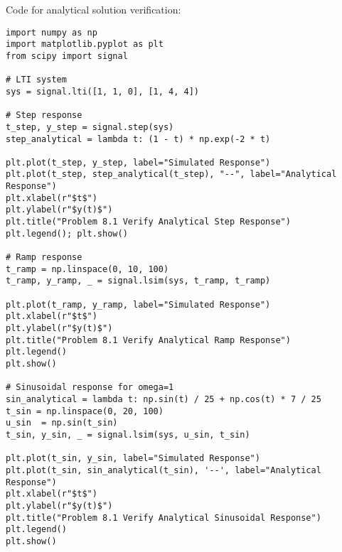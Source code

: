 Code for analytical solution verification:

\begin{verbatim}
import numpy as np
import matplotlib.pyplot as plt
from scipy import signal

# LTI system
sys = signal.lti([1, 1, 0], [1, 4, 4])

# Step response
t_step, y_step = signal.step(sys)
step_analytical = lambda t: (1 - t) * np.exp(-2 * t)

plt.plot(t_step, y_step, label="Simulated Response")
plt.plot(t_step, step_analytical(t_step), "--", label="Analytical Response")
plt.xlabel(r"$t$")
plt.ylabel(r"$y(t)$")
plt.title("Problem 8.1 Verify Analytical Step Response")
plt.legend(); plt.show()

# Ramp response
t_ramp = np.linspace(0, 10, 100)
t_ramp, y_ramp, _ = signal.lsim(sys, t_ramp, t_ramp)

plt.plot(t_ramp, y_ramp, label="Simulated Response")
plt.xlabel(r"$t$")
plt.ylabel(r"$y(t)$")
plt.title("Problem 8.1 Verify Analytical Ramp Response")
plt.legend()
plt.show()

# Sinusoidal response for omega=1
sin_analytical = lambda t: np.sin(t) / 25 + np.cos(t) * 7 / 25
t_sin = np.linspace(0, 20, 100)
u_sin  = np.sin(t_sin)
t_sin, y_sin, _ = signal.lsim(sys, u_sin, t_sin)

plt.plot(t_sin, y_sin, label="Simulated Response")
plt.plot(t_sin, sin_analytical(t_sin), '--', label="Analytical Response")
plt.xlabel(r"$t$")
plt.ylabel(r"$y(t)$")
plt.title("Problem 8.1 Verify Analytical Sinusoidal Response")
plt.legend()
plt.show()
\end{verbatim}
